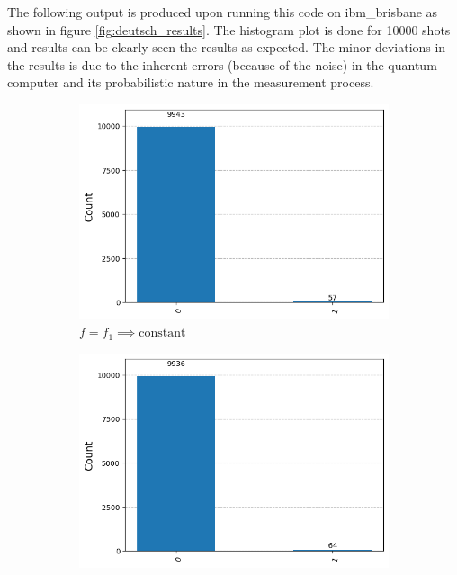 \documentclass[12pt, oneside]{book}
\theoremstyle{definition}
\theoremstyle{definition}
\theoremstyle{remark}
\begin{document}
\begin{enumerate}
    The following output is produced upon running this code on ibm\_brisbane as shown in figure \ref{fig:deutsch_results}. The histogram plot is done for 10000 shots and results can be clearly seen the results as expected. The minor deviations in the results is due to the inherent errors (because of the noise) in the quantum computer and its probabilistic nature in the measurement process.
    \begin{figure}[H]
        \centering
        \begin{subfigure}[b]{0.45\linewidth}
        \centering
        \includegraphics[width=1\linewidth]{../images/deutsch_result_f1.png}
        \caption{$f=f_1 \implies \text{constant}$}
        \label{fig:deutsch_result_f1}
        \end{subfigure}
        \hfill
        \centering
        \begin{subfigure}[b]{0.45\linewidth}
        \centering
        \includegraphics[width=1\linewidth]{../images/deutsch_result_f2.png}

\end{subfigure}
\end{figure}
\end{enumerate}
\end{document}

